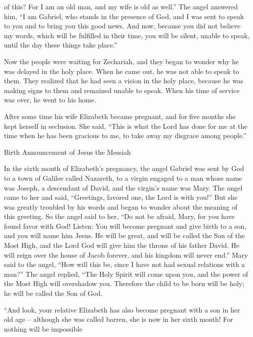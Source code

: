 {of this? For
I
am
an old man,
and
my
wife
is old
as well.”
The angel
answered
him,
“I
am
Gabriel,
who stands
in the presence of
God,
and
I was sent
to speak
to
you
and
to bring
you
this
good news.
And
now,
because
you did
not
believe
my
words,
which
will be fulfilled
in
their
time,
you
will be silent,
unable
to speak,
until
the day
these things
take place.”
\par }{\PP {}Now
the people
were
waiting for
Zechariah,
and
they began to wonder
why he
was delayed
in
the holy place.
When
he came out,
he was
not
able
to speak
to them.
They realized
that
he had seen
a vision
in
the holy place,
because he
was
making signs
to them
and
remained
unable to speak.
When
his
time
of service
was over,
he went
to
his
home.
\par }{\PP {}After
some time
his
wife
Elizabeth
became pregnant,
and
for five
months
she kept
herself
in seclusion.
She said,
“This is
what the Lord
has done
for me
at
the time
when he has been gracious
to me, to take away
my
disgrace
among
people.”
\par }{\SH Birth Announcement of Jesus the Messiah
\par }{\PP {}In
the sixth
month
of Elizabeth’s pregnancy, the angel
Gabriel
was sent
by
God
to
a town
of Galilee
called
Nazareth,
to
a virgin
engaged
to a man
whose
name
was Joseph,
a descendant
of David,
and
the virgin’s
name
was Mary.
The angel came
to
her
and said,
“Greetings,
favored
one, the Lord
is with
you!”
But
she was greatly troubled
by
his words
and
began to wonder
about the meaning
of this
greeting.
So
the angel
said
to her,
“Do
not
be afraid,
Mary,
for
you have found
favor
with
God!
Listen: You will become
pregnant
and
give birth
to a son,
and
you will name
him
Jesus.
He
will be
great,
and
will be called
the Son
of the Most High,
and
the Lord
God
will give
him
the throne
of
his
father
David.
He will reign
over
the house
of Jacob
forever,
and
his
kingdom
will
never
end.”
Mary
said
to
the angel,
“How
will
this
be,
since
I have
not
had
sexual relations with a man?”
The angel
replied, “The Holy
Spirit
will come upon
you,
and
the power
of the Most High
will overshadow
you.
Therefore
the child to be born
will be holy;
he will be called
the Son
of God.
\par }{\PP {}“And
look,
your
relative
Elizabeth
has
also
become pregnant
with a son
in
her
old age
– although she was called
barren,
she is
now in her
sixth
month!
For
nothing
will be impossible
}
